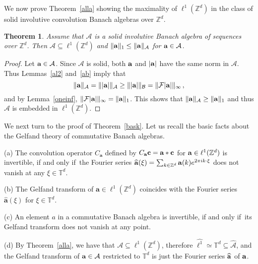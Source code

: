 \documentclass[12pt]{amsart}
\newtheorem{theorem}{Theorem}[section]
\theoremstyle{definition}
\theoremstyle{remark}
\numberwithin{equation}{section}
\def\cA{\mathcal{A}}
\def\bZ{{\mathbb{Z}}}
\def\bT{{\mathbb{T}}}
\def\zd{\bZ^d}
\def\cA{\mathcal{A}}
\newcommand{\bba}{{\bf a}}
\newcommand{\bbc}{{\bf c}}
\newcommand{\fif}{if and only if}
\newcommand{\Cal}{\mathcal}
\newcommand{\ac}{\Cal A}
\begin{document}
We now prove Theorem~\ref{alla} showing the maximality of  $\ell
^1(\zd)$ in the class of  solid involutive  convolution Banach
algebras over $\zd$.%
\begin{theorem}\label{al1}
Assume that  $\Cal A$ is  a solid involutive Banach algebra of
sequences over $\zd $.  Then $\Cal A\subseteq \ell ^1(\zd)$ and
$\|\bba\|_1\le\|\bba\|_{\Cal A}$ for $\bba\in\ac$.
\end{theorem}
\begin{proof}
Let $\bba\in \cA$. Since  $\Cal A$ is solid, both  $\bba$ and
$|\bba|$ have the same
 norm in $\cA$. Thus Lemmas~\ref{al2} and~\ref{ab} imply that
\[
\|\bba\|_{\Cal A}=\||\bba|\|_{\Cal A}\ge \||\bba|\|_{\Cal
B}=\|\Cal F|\bba|\|_\infty \, ,
\]
and by Lemma~\ref{oneinf},  $\|\Cal F|\bba|\|_\infty =
\|\bba\|_1$. This shows that $\|\bba\|_{\Cal A}\ge\|\bba\|_1$ and
thus $\cA $ is embedded in $\ell ^1(\zd )$.
\end{proof}


\vspace{ 4 mm}


We next turn to the proof of Theorem~\ref{bask}. Let us recall the
basic facts about the Gelfand theory of  commutative Banach
algebras.

 (a) The convolution operator
$C_{\mathbf{a}}$ defined by $C_{\bba } \bbc = \bba \ast \bbc $ for
$\bba \in \ell ^1(\zd)$ is invertible, \fif\ the Fourier series
$\widehat{\mathbf{a}}(\xi ) = \sum _{k\in \zd } \bba(k) e^{2\pi i
k\cdot \xi } $  does not vanish at any $\xi \in \bT ^d$.

(b)  The Gelfand transform of $\mathbf{a}\in \ell ^1(\zd )$
coincides with the Fourier series $\widehat{\mathbf{a}}(\xi )$
for $\xi \in \bT ^d$.

(c) An element $a$ in a commutative Banach algebra is invertible,
\fif\ its Gelfand transform does not vanish at any point.

(d)  By Theorem~\ref{alla}, we have that $\cA \subseteq \ell
^1(\zd )$, therefore $\widehat{\ell ^1} \simeq \bT ^d \subseteq
\widehat{\cA }$, and the Gelfand transform of $\bba \in \cA $
restricted to $\bT ^d$ is just the Fourier series $\widehat{\bba
}$ of $\bba $.
\end{document}
